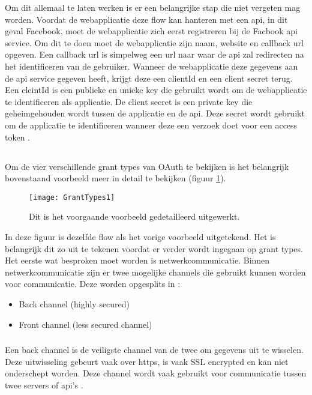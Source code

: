Om dit allemaal te laten werken is er een belangrijke stap die niet vergeten mag worden. Voordat de webapplicatie deze flow kan hanteren met een api, in dit geval Facebook, moet de webapplicatie zich eerst registreren bij de Facbook api service. Om dit te doen moet de webapplicatie zijn naam, website en callback url opgeven. Een callback url is simpelweg een url naar waar de api zal redirecten na het identificeren van de gebruiker. Wanneer de webapplicatie deze gegevens aan de api service gegeven heeft, krijgt deze een clientId en een client secret terug. Een cleintId is een publieke en unieke key die gebruikt wordt om de webapplicatie te identificeren als applicatie. De client secret is een private key die geheimgehouden wordt tussen de applicatie en de api. Deze secret wordt gebruikt om de applicatie te identificeren wanneer deze een verzoek doet voor een access token \autocite{OktaDev2018}. 

\subsection{}
Om de vier verschillende grant types van OAuth te bekijken is het belangrijk bovenstaand voorbeeld meer in detail te bekijken (figuur \ref{fig:grantTypes1}).
\begin{figure}[H]
	\centering
	\texttt{[image: GrantTypes1]} 
	\caption[Gedetailleerd voorbeeld voor uitleg grant types]{Dit is het voorgaande voorbeeld gedetailleerd uitgewerkt.}
	\label{fig:grantTypes1}
\end{figure}
In deze figuur is dezelfde flow als het vorige voorbeeld uitgetekend. Het is belangrijk dit zo uit te tekenen voordat er verder wordt ingegaan op grant types.
Het eerste wat besproken moet worden is netwerkcommunicatie. Binnen netwerkcommunicatie zijn er twee mogelijke channels die gebruikt kunnen worden voor communicatie. Deze worden opgesplits in \autocite{OktaDev2018}: 
\begin{itemize}
	\item Back channel (highly secured)
	\item Front channel (less secured channel)
\end{itemize}
\subsubsection{}
Een back channel is de veiligste channel van de twee om gegevens uit te wisselen. Deze uitwisseling gebeurt vaak over https, is vaak SSL encrypted en kan niet onderschept worden. Deze channel wordt vaak gebruikt voor communicatie tussen twee servers of api's \autocite{OktaDev2018}.
